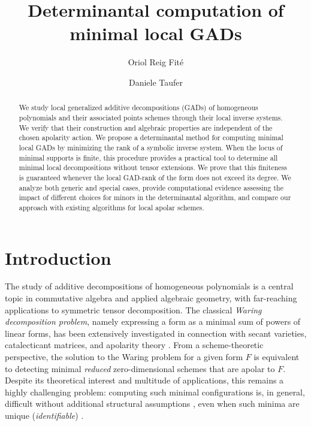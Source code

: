 \documentclass{amsart}
\theoremstyle{plain}
\numberwithin{equation}{section}
\begin{document}
\title{Determinantal computation of minimal local GADs}



\author[O. Reig Fité]{Oriol Reig Fité}
\address{Universit\`a di Trento, Via Sommarive, 14 - 38123 Povo (Trento), Italy}

\author[D. Taufer]{Daniele Taufer}
\address{KU Leuven, Celestijnenlaan 200A, 3001 Leuven, Belgium}



\begin{abstract}
We study local generalized additive decompositions (GADs) of homogeneous polynomials and their associated points schemes through their local inverse systems.
We verify that their construction and algebraic properties are independent of the chosen apolarity action.
We propose a determinantal method for computing minimal local GADs by minimizing the rank of a symbolic inverse system.
When the locus of minimal supports is finite, this procedure provides a practical tool to determine all minimal local decompositions without tensor extensions.
We prove that this finiteness is guaranteed whenever the local GAD-rank of the form does not exceed its degree.
We analyze both generic and special cases, provide computational evidence assessing the impact of different choices for minors in the determinantal algorithm, and compare our approach with existing algorithms for local apolar schemes.
\end{abstract}


\maketitle



\section{Introduction}
The study of additive decompositions of homogeneous polynomials is a central topic in commutative algebra and applied algebraic geometry, with far-reaching applications to symmetric tensor decomposition.
The classical \emph{Waring decomposition problem}, namely expressing a form as a minimal sum of powers of linear forms, has been extensively investigated in connection with secant varieties, catalecticant matrices, and apolarity theory \cite{BB12,BB14,BK24,IK99,L11}.
From a scheme-theoretic perspective, the solution to the Waring problem for a given form $F$ is equivalent to detecting minimal \emph{reduced} zero-dimensional schemes that are apolar to $F$.
Despite its theoretical interest and multitude of applications, this remains a highly challenging problem: computing such minimal configurations is, in general, difficult without additional structural assumptions \cite{BT20,BCMT10}, even when such minima are unique (\emph{identifiable}) \cite{CM23,COV14}.
\end{document}
